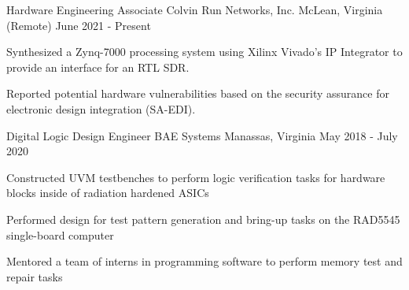 \begin{cventries}
\cventry
{Hardware Engineering Associate} %
{Colvin Run Networks, Inc.} %
{McLean, Virginia (Remote)} %
{June 2021 - Present} %
{
\begin{cvitems}
\item{Synthesized a Zynq-7000 processing system using Xilinx Vivado's IP Integrator to provide an interface for an RTL SDR.}
\item {Reported potential hardware vulnerabilities based on the security assurance for electronic design integration (SA-EDI).}
\end{cvitems}
}




\cventry
{Digital Logic Design Engineer} %
{BAE Systems} %
{Manassas, Virginia} %
{May 2018 - July 2020} %
{ %
\begin{cvitems}
\item {Constructed UVM testbenches to perform logic verification tasks for hardware blocks inside of radiation hardened ASICs}
\item {Performed design for test pattern generation and bring-up tasks on the RAD5545 single-board computer}
\item {Mentored a team of interns in programming software to perform memory test and repair tasks}
\end{cvitems}
}


\end{cventries}
